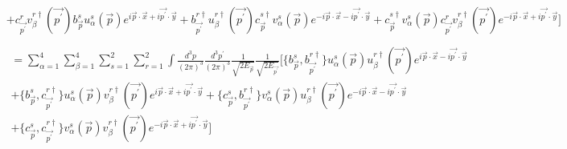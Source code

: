 \documentclass[12pt, letterpaper]{article}
\newcommand*{\1}{\hspace{1pt}}
\begin{document}
\begin{align*}
    & + c^{r} _{\overrightarrow{p ^{\prime}}}v^{r \dagger} _{\beta}(\overrightarrow{p ^{\prime}})b^{s} _{\overrightarrow{p}}u^{s} _{\alpha}(\overrightarrow{p})e ^{i \overrightarrow{p} \cdot \overrightarrow{x} + i \overrightarrow{p^{\prime}} \cdot \overrightarrow{y}} + b^{r \dagger} _{\overrightarrow {p ^{\prime}}}u^{r \dagger} _{\beta}(\overrightarrow{p ^{\prime}}) c^{s \dagger} _{\overrightarrow{p}}v^{s} _{\alpha}(\overrightarrow{p}) e ^{-i \overrightarrow{p} \cdot \overrightarrow{x} -i \overrightarrow{p^{\prime}} \cdot \overrightarrow{y}} + c^{s \dagger} _{\overrightarrow{p}}v^{s} _{\alpha}(\overrightarrow{p}) c^{r} _{\overrightarrow{p ^{\prime}}}v^{r \dagger} _{\beta}(\overrightarrow{p ^{\prime}}) e ^{-i \overrightarrow{p} \cdot \overrightarrow{x} +i \overrightarrow{p^{\prime}} \cdot \overrightarrow{y}} \bigg]\\ 
\end{align*}
\begin{align}
    \begin{split}    
    & = \sum_{\alpha = 1}^{4}\sum_{\beta = 1}^{4} \sum_{s = 1}^{2} \sum_{r = 1}^{2} \int \frac{d ^{3} p}{(2 \pi) ^{3}} \frac{d ^{3} p ^{\prime}}{(2 \pi) ^{3}} \frac{1}{\sqrt{2 E _{\overrightarrow{p}}}} \frac{1}{\sqrt{2 E _{\overrightarrow{p^{\prime}}}}}\bigg[ \big\{b^{s} _{\overrightarrow{p}}, b^{r \dagger} _{\overrightarrow {p ^{\prime}}}\big\} u^{s} _{\alpha}(\overrightarrow{p})u^{r \dagger} _{\beta}(\overrightarrow{p ^{\prime}})e ^{i \overrightarrow{p} \cdot \overrightarrow{x} -i \overrightarrow{p^{\prime}} \cdot \overrightarrow{y}} \\ 
    &+ \big\{b^{s} _{\overrightarrow{p}}, c^{r \dagger} _{\overrightarrow {p ^{\prime}}}\big\}u^{s} _{\alpha}(\overrightarrow{p})v^{r \dagger} _{\beta}(\overrightarrow{p ^{\prime}})e ^{i \overrightarrow{p} \cdot \overrightarrow{x} + i \overrightarrow{p^{\prime}} \cdot \overrightarrow{y}} + \big\{c^{s} _{\overrightarrow{p}}, b^{r \dagger} _{\overrightarrow {p ^{\prime}}}\big\}v^{s} _{\alpha}(\overrightarrow{p})u^{r \dagger} _{\beta}(\overrightarrow{p ^{\prime}})e ^{-i \overrightarrow{p} \cdot \overrightarrow{x} - i \overrightarrow{p^{\prime}} \cdot \overrightarrow{y}}  \\ 
    &+ \big\{c^{s} _{\overrightarrow{p}}, c^{r \dagger} _{\overrightarrow {p ^{\prime}}}\big\}v^{s} _{\alpha}(\overrightarrow{p})v^{r \dagger} _{\beta}(\overrightarrow{p ^{\prime}})e ^{-i \overrightarrow{p} \cdot \overrightarrow{x} + i \overrightarrow{p^{\prime}} \cdot \overrightarrow{y}} \bigg]
    \end{split}
\end{align}
\end{document}
